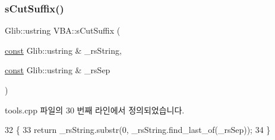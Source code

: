\subsubsection{\texorpdfstring{s\+Cut\+Suffix()}{sCutSuffix()}\hspace{0.1cm}{\footnotesize\ttfamily [2/2]}}
{\footnotesize\ttfamily Glib\+::ustring V\+B\+A\+::s\+Cut\+Suffix (\begin{DoxyParamCaption}\item[{\mbox{\hyperlink{getopt1_8c_a2c212835823e3c54a8ab6d95c652660e}{const}} Glib\+::ustring \&}]{\+\_\+rs\+String,  }\item[{\mbox{\hyperlink{getopt1_8c_a2c212835823e3c54a8ab6d95c652660e}{const}} Glib\+::ustring \&}]{\+\_\+rs\+Sep }\end{DoxyParamCaption})}



tools.\+cpp 파일의 30 번째 라인에서 정의되었습니다.


\begin{DoxyCode}
32 \{
33   \textcolor{keywordflow}{return} \_rsString.substr(0, \_rsString.find\_last\_of(\_rsSep));
34 \}
\end{DoxyCode}
